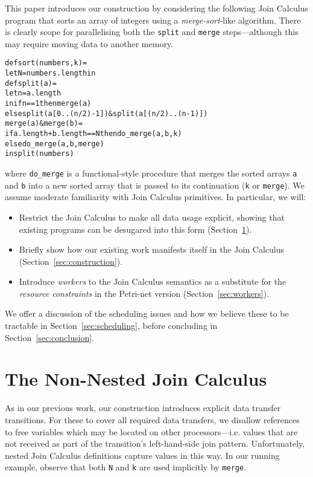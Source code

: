 \documentclass{eptcs}
\begin{document}
This paper introduces our construction by considering the following Join
Calculus program that sorts an array of integers using a {\em merge-sort}-like
algorithm. There is clearly scope for parallelising both the \texttt{split}
and \texttt{merge} steps---although this may require moving data to another
memory.
\begin{alltt}\small
  def sort(numbers, k) =
    let N = numbers.length in
    def split(a) =
          let n = a.length
          in  if n == 1 then merge(a)
                        else split(a[0..(n/2)-1]) & split(a[(n/2)..(n-1)])
        merge(a) & merge(b) =
          if a.length + b.length == N then do_merge(a, b, k)
                                      else do_merge(a, b, merge)
    in split(numbers)
\end{alltt}
where \texttt{do\_merge} is a functional-style procedure that merges the sorted
arrays \texttt{a} and \texttt{b} into a new sorted array that is passed to its
continuation (\texttt{k} or \texttt{merge}). We assume moderate familiarity with
Join Calculus primitives. In particular, we will:
\begin{itemize}
  \item Restrict the Join Calculus to make all data usage explicit, showing that
        existing programs can be desugared into this form
        (Section~\ref{sec:non-nested}).
  \item Briefly show how our existing work manifests itself in the Join Calculus
        (Section~\ref{sec:construction}).
  \item Introduce {\em workers} to the Join Calculus semantics as a substitute
        for the {\em resource constraints} in the Petri-net version
        (Section~\ref{sec:workers}).
\end{itemize}
We offer a discussion of the scheduling issues and how we believe these to be
tractable in Section~\ref{sec:scheduling}, before concluding in
Section~\ref{sec:conclusion}.

\section{The Non-Nested Join Calculus}\label{sec:non-nested}
As in our previous work, our construction introduces explicit data
transfer transitions.  For these to cover all required data transfers, we
disallow references to free variables which may be located on other
processors---i.e. values that are not received as part of the transition's
left-hand-side join pattern.  Unfortunately, nested Join Calculus definitions
capture values in this way.  In our running example, observe that both
\texttt{N} and \texttt{k} are used implicitly by \texttt{merge}.
\end{document}
